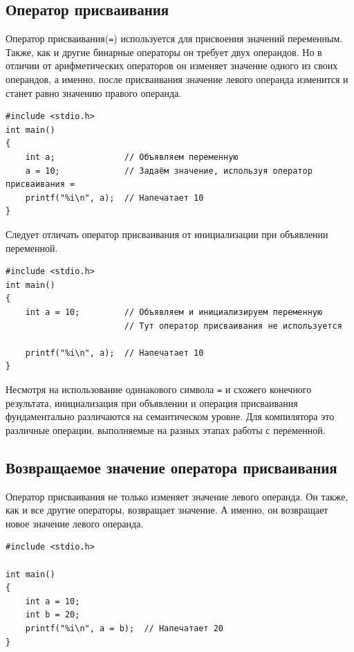 \documentclass{article}
\begin{document}
\subsection*{Оператор присваивания}
Оператор присваивания(\texttt{=}) используется для присвоения значений переменным. Также, как и другие бинарные операторы он требует двух операндов. Но в отличии от арифметических операторов он изменяет значение одного из своих операндов, а именно, после присваивания значение левого операнда изменится и станет равно значению правого операнда.
\begin{lstlisting}
#include <stdio.h>
int main()
{
	int a;				// Объявляем переменную
	a = 10;             // Задаём значение, используя оператор присваивания =
	printf("%i\n", a);  // Напечатает 10
}
\end{lstlisting}

\noindent Следует отличать оператор присваивания от инициализации при объявлении переменной. 
\begin{lstlisting}
#include <stdio.h>
int main()
{
	int a = 10;			// Объявляем и инициализируем переменную
		    			// Тут оператор присваивания не используется
	
	printf("%i\n", a);  // Напечатает 10
}
\end{lstlisting}
Несмотря на использование одинакового символа \texttt{=} и схожего конечного результата, инициализация при объявлении и операция присваивания фундаментально различаются на семантическом уровне. Для компилятора это различные операции, выполняемые на разных этапах работы с переменной.

\subsection*{Возвращаемое значение оператора присваивания}
Оператор присваивания не только изменяет значение левого операнда. Он также, как и все другие операторы, возвращает значение. А именно, он возвращает новое значение левого операнда.
\begin{lstlisting}
#include <stdio.h>

int main()
{
    int a = 10;
    int b = 20;
    printf("%i\n", a = b);  // Напечатает 20
}
\end{lstlisting}
\end{document}
